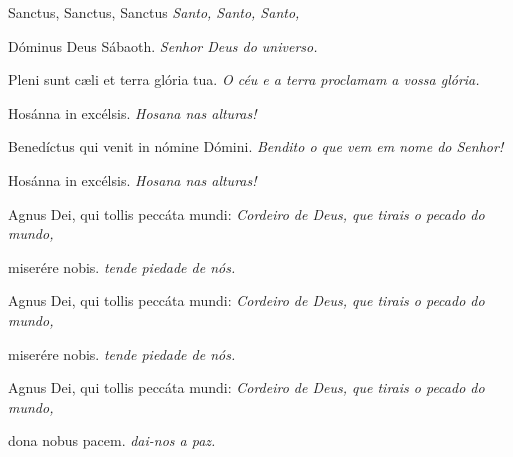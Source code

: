 
\begin{paracol}{2}
  Sanctus, Sanctus, Sanctus
  \switchcolumn
  \emph{Santo, Santo, Santo,}
  \switchcolumn*

  Dóminus Deus Sábaoth.
  \switchcolumn
  \emph{Senhor Deus do universo.}
  \switchcolumn*

  Pleni sunt c{\ae}li et terra glória tua.
  \switchcolumn
  \emph{O céu e a terra proclamam a vossa glória.}
  \switchcolumn*

  Hosánna in excélsis.
  \switchcolumn
  \emph{Hosana nas alturas!}
  \switchcolumn*

  Benedíctus qui venit in nómine Dómini.
  \switchcolumn
  \emph{Bendito o que vem em nome do Senhor!}
  \switchcolumn*

  Hosánna in excélsis.
  \switchcolumn
  \emph{Hosana nas alturas!}
\end{paracol}


\begin{paracol}{2}
  Agnus Dei, qui tollis peccáta mundi:
  \switchcolumn
  \emph{Cordeiro de Deus, que tirais o pecado do mundo,}
  \switchcolumn*

  miserére nobis.
  \switchcolumn
  \emph{tende piedade de nós.}
  \switchcolumn*

  Agnus Dei, qui tollis peccáta mundi:
  \switchcolumn
  \emph{Cordeiro de Deus, que tirais o pecado do mundo,}
  \switchcolumn*

  miserére nobis.
  \switchcolumn
  \emph{tende piedade de nós.}
  \switchcolumn*

  Agnus Dei, qui tollis peccáta mundi:
  \switchcolumn
  \emph{Cordeiro de Deus, que tirais o pecado do mundo,}
  \switchcolumn*

  dona nobus pacem.
  \switchcolumn
  \emph{dai-nos a paz.}
  \switchcolumn*
\end{paracol}